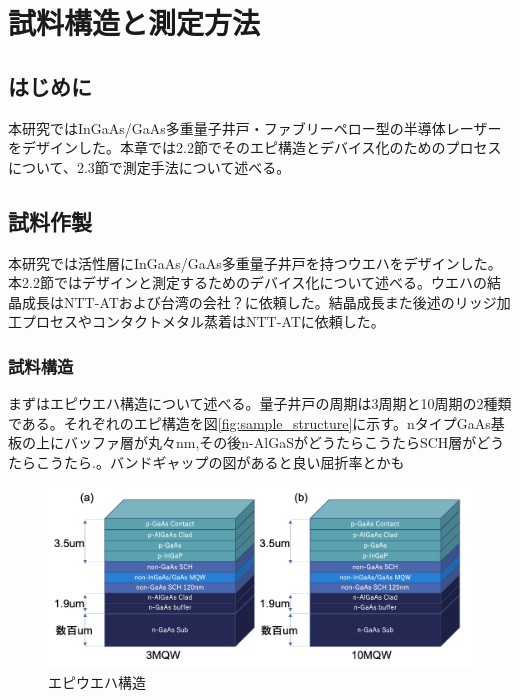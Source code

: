 
\chapter{試料構造と測定方法}%

\section{はじめに}%
本研究ではInGaAs/GaAs多重量子井戸・ファブリーペロー型の半導体レーザーをデザインした。本章では2.2節でそのエピ構造とデバイス化のためのプロセスについて、2.3節で測定手法について述べる。
\section{試料作製}%
本研究では活性層にInGaAs/GaAs多重量子井戸を持つウエハをデザインした。本2.2節ではデザインと測定するためのデバイス化について述べる。ウエハの結晶成長はNTT-ATおよび台湾の会社？に依頼した。結晶成長また後述のリッジ加工プロセスやコンタクトメタル蒸着はNTT-ATに依頼した。

\subsection{試料構造}%
まずはエピウエハ構造について述べる。量子井戸の周期は3周期と10周期の2種類である。それぞれのエピ構造を図\ref{fig:sample_structure}に示す。nタイプGaAs基板の上にバッファ層が丸々nm,その後n-AlGaSがどうたらこうたらSCH層がどうたらこうたら.。バンドギャップの図があると良い屈折率とかも
\begin{figure}[t]
	\centering
	\includegraphics[width=15cm]{figure/fig_2_1_sample_structure}
	\caption{エピウエハ構造}
	\label{fig_2_1_sample_structure}
\end{figure}

